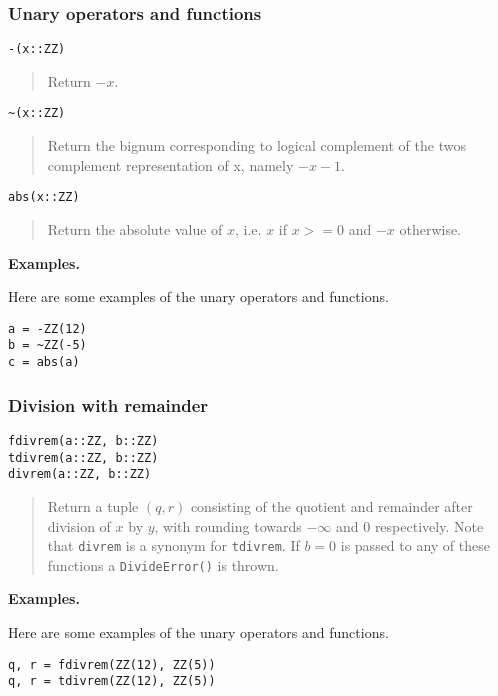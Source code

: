 \documentclass[a4paper,10pt]{article}
\newcommand{\code}{\lstinline}
\newcommand{\desc}[1]{\vspace{-3mm}\begin{quote}#1\end{quote}}
\begin{document}
{{{\subsubsection{Unary operators and functions}

\begin{lstlisting}
-(x::ZZ)
\end{lstlisting}

\desc{Return $-x$.}

\begin{lstlisting}
~(x::ZZ)
\end{lstlisting}

\desc{Return the bignum corresponding to logical complement of the twos 
complement representation of x, namely $-x - 1$.}

\begin{lstlisting}
abs(x::ZZ)
\end{lstlisting}

\desc{Return the absolute value of $x$, i.e. $x$ if $x >= 0$ and $-x$ otherwise.}

\textbf{Examples.}

Here are some examples of the unary operators and functions.

\begin{lstlisting}
a = -ZZ(12)
b = ~ZZ(-5)
c = abs(a)
\end{lstlisting}

\subsubsection{Division with remainder}

\begin{lstlisting}
fdivrem(a::ZZ, b::ZZ)
tdivrem(a::ZZ, b::ZZ)
divrem(a::ZZ, b::ZZ)
\end{lstlisting}

\desc{Return a tuple $(q, r)$ consisting of the quotient and remainder after 
division of $x$ by $y$, with rounding towards $-\infty$ and $0$ respectively. Note 
that \code{divrem} is a synonym for \code{tdivrem}. If $b = 0$ is passed to any
of these functions a \code{DivideError()} is thrown.}

\textbf{Examples.}

Here are some examples of the unary operators and functions.

\begin{lstlisting}
q, r = fdivrem(ZZ(12), ZZ(5))
q, r = tdivrem(ZZ(12), ZZ(5))
\end{lstlisting}

}}}
\end{document}
